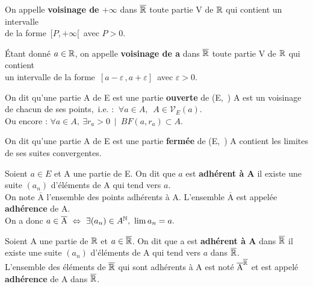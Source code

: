 On appelle \textbf{voisinage de \(+\infty\)} dans \(\overline{\mathbb{R}}\) toute partie V de \(\mathbb{R}\) qui contient un intervalle\\
de la forme \(\,[P,+\infty[\,\) avec \(P>0\).\vspace{0.1cm}

Étant donné \(a\in \mathbb{R}\), on appelle \textbf{voisinage de a} dans \(\overline{\mathbb{R}}\) toute partie V de \(\mathbb{R}\) qui contient\\
un intervalle de la forme \(\,[a-\varepsilon\,,a+\varepsilon]\,\) avec \(\varepsilon>0\).

\vspace{1.3cm}

On dit qu'une partie A de E est une partie \textbf{ouverte} de (E,\ \normtxt{\ }) \ssi A est un voisinage de chacun de ses points,\, i.e. : \(\ \forall a\in A,\ \; A\in \mathcal{V}_E(a) \).\vspace{0.1cm}\\
Ou encore : \(\forall a\in A,\ \exists r_a>0 \ \mid \ BF(a,r_a)\subset A. \)

\vspace{1cm}

On dit qu'une partie A de E est une partie \textbf{fermée} de (E,\ \normtxt{\ }) \ssi A contient les limites de ses suites convergentes.

\vspace{1cm}

Soient \(a\in E\) et A une partie de E. On dit que \(a\) est \textbf{adhérent à A} \ssi il existe une suite \((a_n)\) d'éléments de A qui tend vers $a$.\vspace{0.1cm}\\
On note \(\overline{\text{A}}\) l'ensemble des points adhérents à A. L'ensemble \(\overline{\text{A}}\) est appelée \textbf{adhérence} de A.\vspace{0.1cm}\\
On a donc \(a\in \overline{\text{A}}\  \Leftrightarrow \ \exists(a_n)\in A^{\mathbb{N}},\ \lim a_n = a. \)

\vspace{0.4cm}

Soient A une partie de \(\mathbb{R}\) et \(a\in \overline{\mathbb{R}}\). On dit que a est \textbf{adhérent à A} dans \(\overline{\mathbb{R}}\) \ssi il existe une suite \((a_n)\) d'éléments de A qui tend vers $a$ dans \(\overline{\mathbb{R}}\).\vspace{-0.1cm}\\
L'ensemble des éléments de \(\overline{\mathbb{R}}\) qui sont adhérents à A est noté \(\overline{\text{A}}^{\overline{\mathbb{R}}}\) et est appelé \textbf{adhérence} de A dans \(\overline{\mathbb{R}}\).

